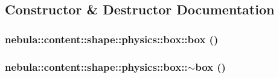 \subsection{Constructor \& Destructor Documentation}
\hypertarget{classnebula_1_1content_1_1shape_1_1physics_1_1box_a8c863aef9d96cade002947380b85f407}{
\subsubsection[{box}]{\setlength{\rightskip}{0pt plus 5cm}nebula::content::shape::physics::box::box ()}}
\label{classnebula_1_1content_1_1shape_1_1physics_1_1box_a8c863aef9d96cade002947380b85f407}
\hypertarget{classnebula_1_1content_1_1shape_1_1physics_1_1box_a838df4a991e498b748ec2c034e6c3e4a}{
\subsubsection[{$\sim$box}]{\setlength{\rightskip}{0pt plus 5cm}nebula::content::shape::physics::box::$\sim$box ()}}
\label{classnebula_1_1content_1_1shape_1_1physics_1_1box_a838df4a991e498b748ec2c034e6c3e4a}


